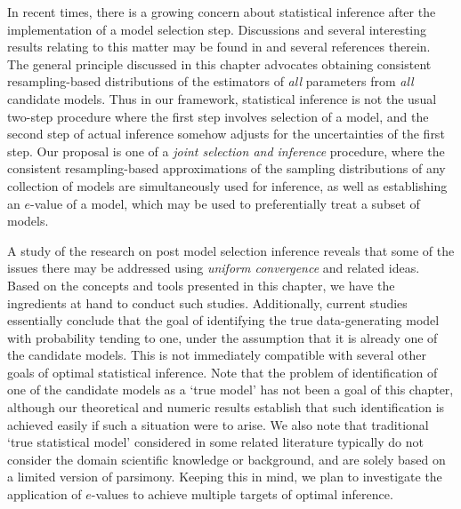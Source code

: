 In recent times, there is a growing concern about statistical inference after the implementation of a model selection step. Discussions and several interesting results relating to this matter may be found in  \cite{Yang05, LeebPotscher05, ChangEtal14, TibshiraniEtal15, Tibshiranietal16} and several references therein. The general principle discussed in this chapter advocates obtaining consistent resampling-based distributions of the estimators of {\textit{all}} parameters from {\textit{all}} candidate models. Thus in our framework, statistical inference is not the usual two-step procedure where the first step involves selection of a model, and the second  step of actual inference somehow adjusts for the uncertainties of the first step. Our proposal is one of a {\textit{joint selection and inference}} procedure, where the consistent resampling-based approximations of the sampling distributions of any collection of models are simultaneously used for inference, as well as establishing an $e$-value of a model, which may be used to preferentially treat a subset of models. 

A study of the research on post model selection inference reveals that some of the issues there may be addressed using {\textit{uniform convergence}} and related ideas. Based on the concepts and tools presented in this chapter, we have the ingredients at hand to conduct such studies.
% 
Additionally, current studies essentially conclude that the goal of identifying the true data-generating model with probability tending to one, under the assumption that it is already one of the candidate models. This is not immediately compatible with several other goals of optimal statistical inference. Note that the problem of identification of one of the candidate models as a `true model' has not been a goal of this chapter, although our theoretical and numeric results establish that such identification is achieved easily if such a situation were to arise. We also note that traditional `true statistical model' considered in some related literature typically do not consider the domain scientific knowledge or background, and are solely based on a limited version of parsimony. Keeping this in mind, we plan to investigate the application of $e$-values to achieve multiple targets of optimal inference.

